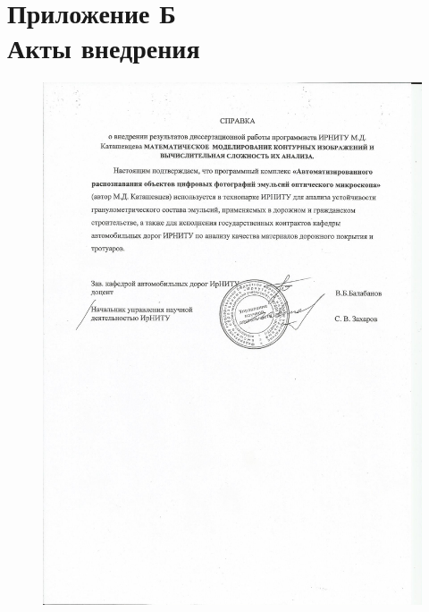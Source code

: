 \chapter*{Приложение Б\\Акты внедрения}
 \label{AppendixB}
\begin{figure}[h]
	\centering
	\includegraphics[width=0.82\linewidth]{images/vnedrenie_1.jpg}
\end{figure}

